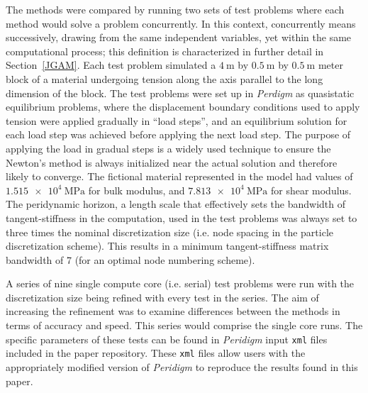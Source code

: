 \documentclass[preprint,12pt]{elsarticle}
\begin{document}
The methods were compared by running two sets of test problems where each
method would solve a problem concurrently. In this context, concurrently means
successively, drawing from the same independent variables, yet within the same
computational process; this definition is characterized in further detail in
Section~\ref{JGAM}. Each test problem simulated a $\SI{4}{\meter}$ by
$\SI{0.5}{\meter}$ by $\SI{0.5}{\meter}$ meter block of a material undergoing
tension along the axis parallel to the long dimension of the block. The test
problems were set up in \emph{Perdigm} as quasistatic equilibrium problems,
where the displacement boundary conditions used to apply tension were applied
gradually in ``load steps'', and an equilibrium solution for each load step was
achieved before applying the next load step. The purpose of applying the load
in gradual steps is a widely used technique to ensure the Newton's method is
always initialized near the actual solution and therefore likely to converge.
The fictional material represented in the model had values of
$\SI{1.515e4}{\mega\pascal}$ for bulk modulus, and $\SI{7.813e4}{\mega\pascal}$
for shear modulus. The peridynamic horizon, a length scale that effectively
sets the bandwidth of tangent-stiffness in the computation, used in the test
problems was always set to three times the nominal discretization size (i.e.
node spacing in the particle discretization scheme). This results in a minimum
tangent-stiffness matrix bandwidth of 7 (for an optimal node numbering scheme).

A series of nine single compute core (i.e. serial) test problems were run with
the discretization size being refined with every test in the series. The aim of
increasing the refinement was to examine differences between the methods in
terms of accuracy and speed. This series would comprise the single core runs.
The specific parameters of these tests can be found in \emph{Peridigm} input
{\tt xml} files included in the paper repository. These {\tt xml} files allow
users with the appropriately modified version of \emph{Peridigm} to reproduce
the results found in this paper.
\end{document}
